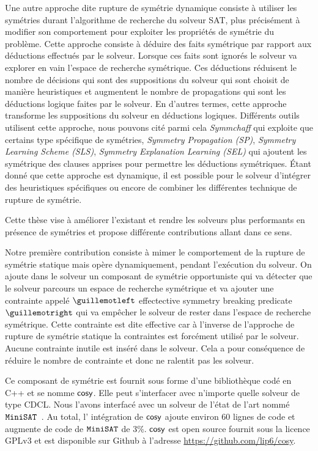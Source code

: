 Une autre approche dite rupture de symétrie dynamique consiste à utiliser les symétries durant l'algorithme de recherche du solveur SAT, plus précisément à modifier son comportement pour exploiter les propriétés de symétrie du problème. Cette approche consiste à déduire des faits symétrique par rapport aux déductions effectués par le solveur. Lorsque ces faits sont ignorés le solveur va explorer en vain l'espace de recherche symétrique.
Ces déductions réduisent le nombre de décisions qui sont des suppositions du solveur qui sont choisit de 
manière heuristiques et augmentent le nombre de propagations qui sont les déductions logique faites par le solveur. En d'autres termes, cette approche transforme les suppositions du solveur en déductions logiques.
Différents outils utilisent cette approche, nous pouvons cité parmi cela \textit{Symmchaff}
qui exploite que certains type spécifique de symétries, \textit{Symmetry Propagation (SP)}, \textit{Symmetry Learning Scheme (SLS)}, \textit{Symmetry Explanation Learning (SEL)} qui ajoutent les symétrique des
clauses apprises pour permettre les déductions symétriques.
Étant donné que cette approche est dynamique, il est possible pour le solveur 
d'intégrer des heuristiques spécifiques ou encore de combiner les différentes technique de rupture de symétrie.


Cette thèse vise à améliorer l'existant et rendre les solveurs plus performants en présence de symétries et
propose différente contributions allant dans ce sens.  


Notre première contribution consiste à mimer le comportement de la rupture de symétrie statique mais 
opère dynamiquement, pendant l'exécution du solveur. On ajoute dans le solveur un composant de symétrie opportuniste qui va détecter que le solveur parcours un espace de recherche symétrique et va ajouter
une contrainte appelé $\guillemotleft$ effectective symmetry breaking predicate $\guillemotright$ qui va empêcher le solveur de rester dans
l'espace de recherche symétrique. Cette contrainte est dite effective car à l'inverse de l'approche 
de rupture de symétrie  statique la contraintes est forcément utilisé par le solveur. Aucune contrainte
inutile est inséré dans le solveur. Cela a pour conséquence de réduire le nombre de contrainte et donc 
ne ralentit pas les solveur.

Ce composant de symétrie est fournit sous forme d'une bibliothèque codé en C++ et se nomme $\textsf{cosy}$.
Elle peut s'interfacer avec n'importe quelle solveur de type CDCL. 
Nous l'avons interfacé avec un solveur de l'état de l'art nommé $\texttt{MiniSAT}$~\cite{een2003extensible}. Au total, l' intégration de $\textsf{cosy}$ ajoute environ 60 lignes de code 
et augmente de code de $\texttt{MiniSAT}$ de 3\%.
$\textsf{cosy}$ est open source fournit sous la licence GPLv3 et est disponible sur Github à l'adresse \url{https://github.com/lip6/cosy}.


